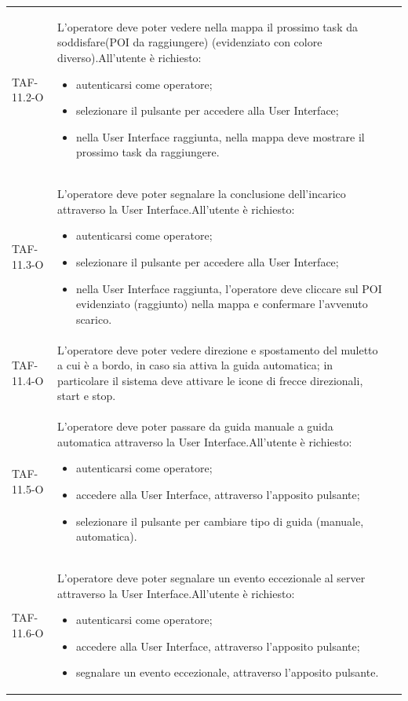 \begin{longtable}{ >{\centering}p{} >{}p{}
		>{\centering}p{}}
	TAF-11.2-O & L'operatore deve poter vedere nella mappa il prossimo task da soddisfare(POI da raggiungere) (evidenziato con colore diverso).\newline All'utente è richiesto: \begin{itemize} \item autenticarsi come operatore; \item selezionare il pulsante per accedere alla User Interface; \item nella User Interface raggiunta, nella mappa deve mostrare il prossimo task da raggiungere.\end{itemize} & 0\tabularnewline
	
	TAF-11.3-O & L'operatore deve poter segnalare la conclusione dell'incarico attraverso la User Interface.\newline All'utente è richiesto: \begin{itemize} \item autenticarsi come operatore; \item selezionare il pulsante per accedere alla User Interface; \item nella User Interface raggiunta, l'operatore deve cliccare sul POI evidenziato (raggiunto) nella mappa e confermare l'avvenuto scarico.\end{itemize} & 0\tabularnewline
	
	TAF-11.4-O & L'operatore deve poter vedere direzione e spostamento del muletto a cui è a bordo, in caso sia attiva la guida automatica; in particolare il sistema deve attivare le icone di frecce direzionali, start e stop.  & 0\tabularnewline
	
	TAF-11.5-O & L'operatore deve poter passare da guida manuale a guida automatica attraverso la User Interface.\newline All'utente è richiesto: \begin{itemize} \item autenticarsi come operatore; \item accedere alla User Interface, attraverso l'apposito pulsante; \item selezionare il pulsante per cambiare tipo di guida (manuale, automatica). \end{itemize} & 0\tabularnewline
	
	TAF-11.6-O & L'operatore deve poter segnalare un evento eccezionale al server attraverso la User Interface.\newline All'utente è richiesto: \begin{itemize} \item autenticarsi come operatore; \item accedere alla User Interface, attraverso l'apposito pulsante; \item segnalare un evento eccezionale, attraverso l'apposito pulsante.\end{itemize} & 0\tabularnewline
	

\end{longtable}
